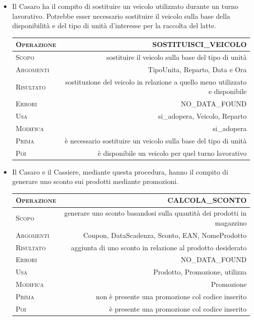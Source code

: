 \documentclass[12pt]{report}
\begin{document}
\begin{itemize}
\item {Il Casaro ha il compito di sostituire un veicolo utilizzato durante un turno lavorativo. Potrebbe esser necessario sostituire il veicolo sulla base della disponibilità e del tipo di unità d'interesse per la raccolta del latte.}

\begin{center}
 \begin{tabular}{l | r} 
 \textsc{Operazione} & SOSTITUISCI\_VEICOLO \\ [0.5ex] 
 \hline
 \textsc{Scopo} & sostituire il veicolo sulla base del tipo di unità \\ 
 \textsc{Argomenti} & TipoUnita, Reparto, Data e Ora \\
 \textsc{Risultato} & sostituzione del veicolo in relazione a quello meno utilizzato e disponibile\\
 \textsc{Errori}& NO\_DATA\_FOUND\\
 \textsc{Usa} & si\_adopera, Veicolo, Reparto\\ 
 \textsc{Modifica} & si\_adopera\\ 
 \textsc{Prima} & è necessario sostituire un veicolo sulla base del tipo di unità\\ 
 \textsc{Poi} & è disponibile un veicolo per quel turno lavorativo\\ [1ex] 
\end{tabular}
\end{center}

\item {Il Casaro e il Cassiere, mediante questa procedura, hanno il compito di generare uno sconto sui prodotti mediante promozioni.}

\begin{center}
 \begin{tabular}{l | r} 
 \textsc{Operazione} & CALCOLA\_SCONTO \\ [0.5ex] 
 \hline
 \textsc{Scopo} & generare uno sconto basandosi sulla quantità dei prodotti in magazzino \\ 
 \textsc{Argomenti} & Coupon, DataScadenza, Sconto, EAN, NomeProdotto \\
 \textsc{Risultato} & aggiunta di uno sconto in relazione al prodotto desiderato\\
 \textsc{Errori}& NO\_DATA\_FOUND\\
 \textsc{Usa} & Prodotto, Promozione, utilizza\\ 
 \textsc{Modifica} & Promozione\\ 
 \textsc{Prima} & non è presente una promozione col codice inserito\\ 
 \textsc{Poi} & è presente una promozione col codice inserito\\ [1ex] 
\end{tabular}
\end{center}


\end{itemize}
\end{document}
